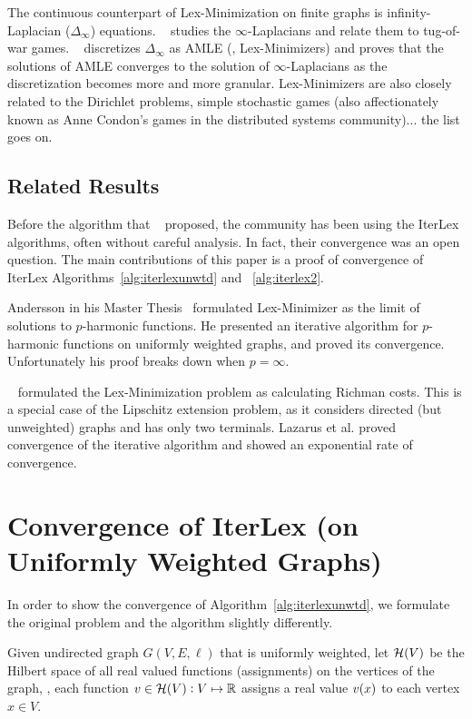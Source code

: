 \documentclass[12pt]{amsart}
\begin{document}
The continuous counterpart of Lex-Minimization on finite graphs is infinity-Laplacian ($\Delta_\infty$) equations. ~\cite{PSSW08} studies the $\infty$-Laplacians and relate them to tug-of-war games. ~\cite{Obe05} discretizes $\Delta_\infty$ as AMLE (\ie, Lex-Minimizers) and proves that the solutions of AMLE converges to the solution of $\infty$-Laplacians as the discretization becomes more and more granular. Lex-Minimizers are also closely related to the Dirichlet problems, simple stochastic games (also affectionately known as Anne Condon's games in the distributed systems community)... the list goes on.

\subsection{Related Results}
Before the algorithm that ~\cite{KRSS15} proposed, the community has been using the IterLex algorithms, often without careful analysis. In fact, their convergence was an open question. The main contributions of this paper is a proof of convergence of IterLex Algorithms~\ref{alg:iterlexunwtd} and ~\ref{alg:iterlex2}.

Andersson in his Master Thesis~\cite{And09} formulated Lex-Minimizer as the limit of solutions to $p$-harmonic functions. He presented an iterative algorithm for $p$-harmonic functions on uniformly weighted graphs, and proved its convergence. Unfortunately his proof breaks down when $p=\infty$.

~\cite{LLPSU99} formulated the Lex-Minimization problem as calculating Richman costs. This is a special case of the Lipschitz extension problem, as it considers directed (but unweighted) graphs and has only two terminals. Lazarus et al. proved convergence of the iterative algorithm and showed an exponential rate of convergence.

\section{Convergence of IterLex (on Uniformly Weighted Graphs)}\label{sec:iterlexconvunwtd}
In order to show the convergence of Algorithm~\ref{alg:iterlexunwtd}, we formulate the original problem and the algorithm slightly differently.

Given undirected graph $G(V,E,\ell)$ that is uniformly weighted, let $\mathcal{H}(V)$ be the Hilbert space of all real valued functions (assignments) on the vertices of the graph, \ie, each function $v\in\mathcal{H}(V): V \mapsto \mathbb R$ assigns a real value $v(x)$ to each vertex $x\in V$.
\end{document}
